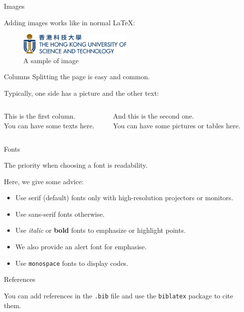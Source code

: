 \begin{frame}{Images}

	Adding images works like in normal \LaTeX:
	
	\begin{figure}[hbt]
		\includegraphics[width=0.5\textwidth]{assets/template/logo-name.pdf}
 		\caption{A sample of image}
	\end{figure}
	
\end{frame}

\begin{frame}{Columns}
	Splitting the page is easy and common.

	Typically, one side has a picture and the other text:
	
	\vspace{20pt}
	
	\begin{columns}
		\begin{column}{0.6\textwidth}
			This is the first column.\\[10pt]
			You can have some texts here.
		\end{column}
		
		\begin{column}{0.3\textwidth}
			And this is the second one.\\[10pt]
			You can have some pictures or tables here.
		\end{column}
	\end{columns}

\end{frame}

\begin{frame}{Fonts}
	
	The priority when choosing a font is readability.
	
	Here, we give some advice:
	\begin{itemize}
		\item Use serif (default) fonts only with high-resolution projectors or monitors.
		\item Use \textsf{sans-serif} fonts otherwise.
		\item Use \textit{italic} or \textbf{bold} fonts to emphasize or highlight points.
		\item We also provide an \alert{alert} font for emphasise.
		\item Use \texttt{monospace} fonts to display codes.
	\end{itemize}

\end{frame}

\begin{frame}{References}

	You can add references in the \texttt{.bib} file and use the \texttt{biblatex} package to cite them\cite{liuAndyshiyiliuHKUSTBeamerTemplate2025}.

\end{frame}